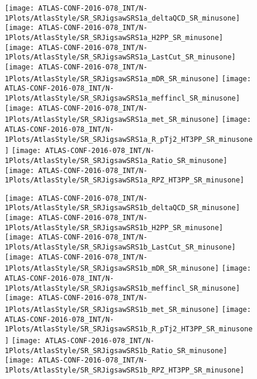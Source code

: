 \clearpage
\begin{figure}[tbph]
\begin{center}
\texttt{[image: ATLAS-CONF-2016-078\_INT/N-1Plots/AtlasStyle/SR\_SRJigsawSRS1a\_deltaQCD\_SR\_minusone]}
\texttt{[image: ATLAS-CONF-2016-078\_INT/N-1Plots/AtlasStyle/SR\_SRJigsawSRS1a\_H2PP\_SR\_minusone]}
\texttt{[image: ATLAS-CONF-2016-078\_INT/N-1Plots/AtlasStyle/SR\_SRJigsawSRS1a\_LastCut\_SR\_minusone]}
\texttt{[image: ATLAS-CONF-2016-078\_INT/N-1Plots/AtlasStyle/SR\_SRJigsawSRS1a\_mDR\_SR\_minusone]}
\texttt{[image: ATLAS-CONF-2016-078\_INT/N-1Plots/AtlasStyle/SR\_SRJigsawSRS1a\_meffincl\_SR\_minusone]}
\texttt{[image: ATLAS-CONF-2016-078\_INT/N-1Plots/AtlasStyle/SR\_SRJigsawSRS1a\_met\_SR\_minusone]}
\texttt{[image: ATLAS-CONF-2016-078\_INT/N-1Plots/AtlasStyle/SR\_SRJigsawSRS1a\_R\_pTj2\_HT3PP\_SR\_minusone]}
\texttt{[image: ATLAS-CONF-2016-078\_INT/N-1Plots/AtlasStyle/SR\_SRJigsawSRS1a\_Ratio\_SR\_minusone]}
\texttt{[image: ATLAS-CONF-2016-078\_INT/N-1Plots/AtlasStyle/SR\_SRJigsawSRS1a\_RPZ\_HT3PP\_SR\_minusone]}
\end{center}
\caption{}
\label{fig:SR_SRJigsawSRG3b_Ratio_SR_minusone}
\end{figure}

\begin{figure}[tbph]
\begin{center}
\end{center}
\caption{}
\label{fig:SR_SRJigsawSRS1a_meffincl_SR_minusone}
\end{figure}

\begin{figure}[tbph]
\begin{center}
\texttt{[image: ATLAS-CONF-2016-078\_INT/N-1Plots/AtlasStyle/SR\_SRJigsawSRS1b\_deltaQCD\_SR\_minusone]}
\texttt{[image: ATLAS-CONF-2016-078\_INT/N-1Plots/AtlasStyle/SR\_SRJigsawSRS1b\_H2PP\_SR\_minusone]}
\texttt{[image: ATLAS-CONF-2016-078\_INT/N-1Plots/AtlasStyle/SR\_SRJigsawSRS1b\_LastCut\_SR\_minusone]}
\texttt{[image: ATLAS-CONF-2016-078\_INT/N-1Plots/AtlasStyle/SR\_SRJigsawSRS1b\_mDR\_SR\_minusone]}
\texttt{[image: ATLAS-CONF-2016-078\_INT/N-1Plots/AtlasStyle/SR\_SRJigsawSRS1b\_meffincl\_SR\_minusone]}
\texttt{[image: ATLAS-CONF-2016-078\_INT/N-1Plots/AtlasStyle/SR\_SRJigsawSRS1b\_met\_SR\_minusone]}
\texttt{[image: ATLAS-CONF-2016-078\_INT/N-1Plots/AtlasStyle/SR\_SRJigsawSRS1b\_R\_pTj2\_HT3PP\_SR\_minusone]}
\texttt{[image: ATLAS-CONF-2016-078\_INT/N-1Plots/AtlasStyle/SR\_SRJigsawSRS1b\_Ratio\_SR\_minusone]}
\texttt{[image: ATLAS-CONF-2016-078\_INT/N-1Plots/AtlasStyle/SR\_SRJigsawSRS1b\_RPZ\_HT3PP\_SR\_minusone]}
\end{center}
\caption{}
\label{fig:SR_SRJigsawSRS1b_H2PP_SR_minusone}
\end{figure}

